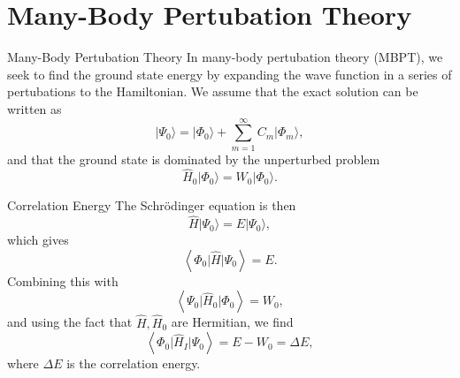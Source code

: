 \documentclass[UKenglish,aspectratio=169]{beamer}
\begin{document}
\section{Many-Body Pertubation Theory}

\begin{frame}{Many-Body Pertubation Theory}
    In many-body pertubation theory (MBPT), we seek to find the
    ground state energy by expanding the wave function in a series of
    pertubations to the Hamiltonian.
    We assume that the exact solution can be written as
    \begin{equation}
        \lvert \Psi_0 \rangle
        = \lvert \Phi_0 \rangle + \sum_{m = 1}^\infty C_m \lvert \Phi_m \rangle,
    \end{equation}
    and that the ground state is dominated by the unperturbed problem
    \begin{equation}
        \hat{H}_0 \lvert \Phi_0 \rangle = W_0 \lvert \Phi_0 \rangle.
    \end{equation}
\end{frame}

\begin{frame}{Correlation Energy}
    The Schrödinger equation is then
    \begin{equation}
        \hat{H} \lvert \Psi_0 \rangle = E \lvert \Psi_0 \rangle,
    \end{equation}
    which gives
    \begin{equation}
        \left\langle \Phi_0 \vert \hat{H} \vert \Psi_0 \right\rangle = E.
    \end{equation}
    Combining this with
    \begin{equation}
        \left\langle \Psi_0 \vert \hat{H}_0 \vert \Phi_0 \right\rangle = W_0,
    \end{equation}
    and using the fact that $\hat{H}, \hat{H}_0$ are Hermitian, we find
    \begin{equation}\label{eq:corr_energy_original}
        \left\langle \Phi_0 \vert \hat{H}_I \vert \Psi_0 \right\rangle
        = E - W_0
        = \Delta E,
    \end{equation}
    where $\Delta E$ is the correlation energy.
\end{frame}
\end{document}
